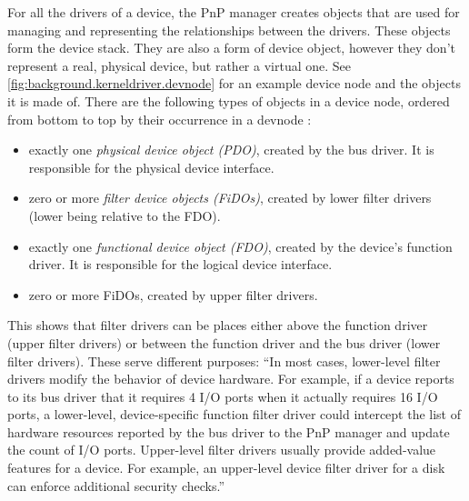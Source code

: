 For all the drivers of a device, the PnP manager creates objects that are used for managing and representing the relationships between the drivers. These objects form the device stack. They are also a form of device object, however they don't represent a real, physical device, but rather a virtual one. See \autoref{fig:background.kerneldriver.devnode} for an example device node and the objects it is made of. There are the following types of objects in a device node, ordered from bottom to top by their occurrence in a devnode \cite{Yosifovich2017}:
\begin{itemize}
	\item exactly one \emph{physical device object (PDO)}, created by the bus driver. It is responsible for the physical device interface.
	\item zero or more \emph{filter device objects (FiDOs)}, created by lower filter drivers (lower being relative to the FDO).
	\item exactly one \emph{functional device object (FDO)}, created by the device's function driver. It is responsible for the logical device interface.
	\item zero or more FiDOs, created by upper filter drivers.
\end{itemize}

This shows that filter drivers can be places either above the function driver (upper filter drivers) or between the function driver and the bus driver (lower filter drivers). These serve different purposes: ``In most cases, lower-level filter drivers modify the behavior of device hardware. For example, if a device reports to its bus driver that it requires 4 I/O ports when it actually requires 16 I/O ports, a lower-level, device-specific function filter driver could intercept the list of hardware resources reported by the bus driver to the PnP manager and update the count of I/O ports. Upper-level filter drivers usually provide added-value features for a device. For example, an upper-level device filter driver for a disk can enforce additional security checks.'' \cite{Yosifovich2017}

